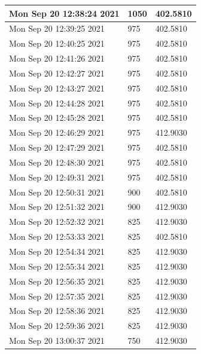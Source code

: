\begin{longtable}{|l|l|l|}
Mon Sep 20 12:38:24 2021 &               1050 &        402.5810 \\ \hline
Mon Sep 20 12:39:25 2021 &                975 &        402.5810 \\ \hline
Mon Sep 20 12:40:25 2021 &                975 &        402.5810 \\ \hline
Mon Sep 20 12:41:26 2021 &                975 &        402.5810 \\ \hline
Mon Sep 20 12:42:27 2021 &                975 &        402.5810 \\ \hline
Mon Sep 20 12:43:27 2021 &                975 &        402.5810 \\ \hline
Mon Sep 20 12:44:28 2021 &                975 &        402.5810 \\ \hline
Mon Sep 20 12:45:28 2021 &                975 &        402.5810 \\ \hline
Mon Sep 20 12:46:29 2021 &                975 &        412.9030 \\ \hline
Mon Sep 20 12:47:29 2021 &                975 &        402.5810 \\ \hline
Mon Sep 20 12:48:30 2021 &                975 &        402.5810 \\ \hline
Mon Sep 20 12:49:31 2021 &                975 &        402.5810 \\ \hline
Mon Sep 20 12:50:31 2021 &                900 &        402.5810 \\ \hline
Mon Sep 20 12:51:32 2021 &                900 &        412.9030 \\ \hline
Mon Sep 20 12:52:32 2021 &                825 &        412.9030 \\ \hline
Mon Sep 20 12:53:33 2021 &                825 &        402.5810 \\ \hline
Mon Sep 20 12:54:34 2021 &                825 &        412.9030 \\ \hline
Mon Sep 20 12:55:34 2021 &                825 &        412.9030 \\ \hline
Mon Sep 20 12:56:35 2021 &                825 &        412.9030 \\ \hline
Mon Sep 20 12:57:35 2021 &                825 &        412.9030 \\ \hline
Mon Sep 20 12:58:36 2021 &                825 &        412.9030 \\ \hline
Mon Sep 20 12:59:36 2021 &                825 &        412.9030 \\ \hline
Mon Sep 20 13:00:37 2021 &                750 &        412.9030 \\ \hline

\end{longtable}
